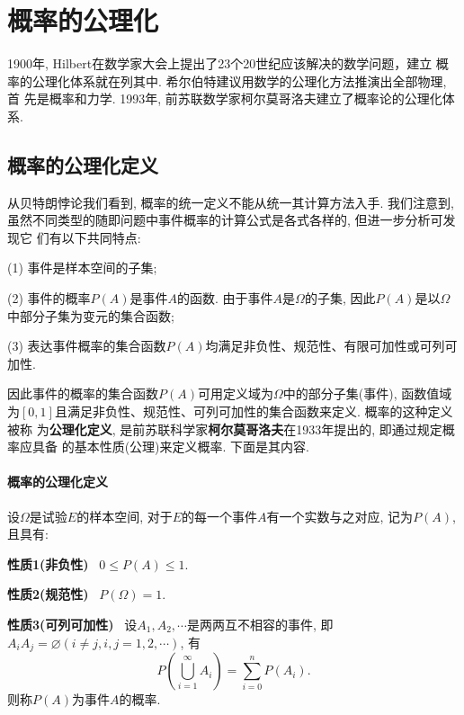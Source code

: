 \section{概率的公理化}

1900年, Hilbert在数学家大会上提出了23个20世纪应该解决的数学问题，建立
概率的公理化体系就在列其中. 希尔伯特建议用数学的公理化方法推演出全部物理, 首
先是概率和力学. 1993年, 前苏联数学家柯尔莫哥洛夫建立了概率论的公理化体系.\cite{冯变英2008贝特朗悖论与概率论的公理化}

\subsection{概率的公理化定义}

从贝特朗悖论我们看到, 概率的统一定义不能从统一其计算方法入手. 我们注意到,
虽然不同类型的随即问题中事件概率的计算公式是各式各样的, 但进一步分析可发现它
们有以下共同特点:
\par (1) 事件是样本空间的子集;
\par (2) 事件的概率$P(A)$是事件$A$的函数. 由于事件$A$是$\Omega$的子集, 因此$P(A)$是以$\Omega$中部分子集为变元的集合函数;
\par (3) 表达事件概率的集合函数$P(A)$均满足非负性、规范性、有限可加性或可列可加性.

\par 因此事件的概率的集合函数$P(A)$可用定义域为$\Omega$中的部分子集(事件), 函数值域
为$[0,1]$且满足非负性、规范性、可列可加性的集合函数来定义. 概率的这种定义被称
为\textbf{公理化定义}, 是前苏联科学家\textbf{柯尔莫哥洛夫}在1933年提出的, 即通过规定概率应具备
的基本性质(公理)来定义概率. 下面是其内容.

\paragraph*{概率的公理化定义}\cite{北京邮电大学理学院数学系概率教研室2010概率论与随机过程} 设$\Omega$是试验$E$的样本空间, 对于$E$的每一个事件$A$有一个实数与之对应, 记为$P(A)$, 且具有:

\par \textbf{性质1(非负性)} \ $0\leqslant P(A) \leqslant 1$.

\par \textbf{性质2(规范性)} \ $P(\Omega) = 1$.

\par \textbf{性质3(可列可加性)} \ 设$A_1,A_2,\cdots$是两两互不相容的事件, 即$A_iA_j = \varnothing(i \neq j,i,j=1,2,\cdots)$, 有
$$
    P(\bigcup_{i=1}^\infty A_i) = \sum\limits_{i=0}^n P(A_i).
$$
则称$P(A)$为事件$A$的概率.

